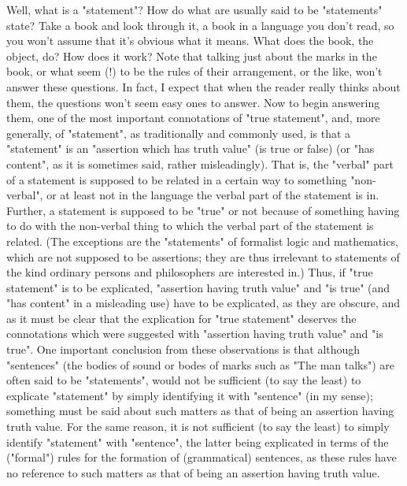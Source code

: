 \documentclass[10pt,twoside,draft]{memoir}
\begin{document}
Well, what is a "statement"? How do what are usually said to be 
"statements" state? Take a book and look through it, a book in a language 
you don't read, so you won't assume that it's obvious what it means. What 
does the book, the object, do? How does it work? Note that talking just 
about the marks in the book, or what seem (!) to be the rules of their 
arrangement, or the like, won't answer these questions. In fact, I expect that 
when the reader really thinks about them, the questions won't seem easy 
ones to answer. Now to begin answering them, one of the most important 
connotations of "true statement", and, more generally, of "statement", as 
traditionally and commonly used, is that a "statement" is an "assertion 
which has truth value" (is true or false) (or "has content", as it is sometimes 
said, rather misleadingly). That is, the "verbal" part of a statement is 
supposed to be related in a certain way to something "non-verbal", or at 
least not in the language the verbal part of the statement is in. Further, a 
statement is supposed to be "true" or not because of something having to do 
with the non-verbal thing to which the verbal part of the statement is 
related. (The exceptions are the "statements" of formalist logic and 
mathematics, which are not supposed to be assertions; they are thus 
irrelevant to statements of the kind ordinary persons and philosophers are 
interested in.) Thus, if "true statement" is to be explicated, "assertion having 
truth value" and "is true" (and "has content" in a misleading use) have to be 
explicated, as they are obscure, and as it must be clear that the explication 
for "true statement" deserves the connotations which were suggested with 
"assertion having truth value" and "is true". One important conclusion from 
these observations is that although "sentences" (the bodies of sound or 
bodes of marks such as "The man talks") are often said to be "statements", 
would not be sufficient (to say the least) to explicate "statement" by simply 
identifying it with "sentence" (in my sense); something must be said about 
such matters as that of being an assertion having truth value. For the same 
reason, it is not sufficient (to say the least) to simply identify "statement" 
with "sentence", the latter being explicated in terms of the ("formal") rules 
for the formation of (grammatical) sentences, as these rules have no 
reference to such matters as that of being an assertion having truth value. 
\end{document}
